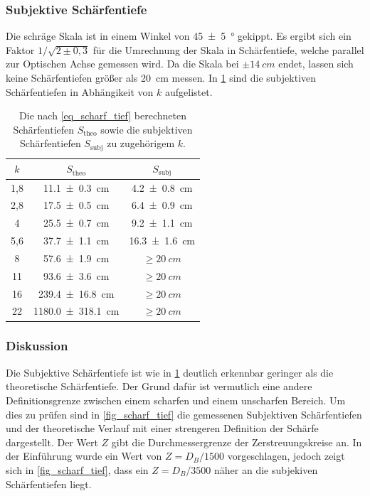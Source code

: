 \documentclass[
	a4paper,
	12pt,
	pagesize,
	ngerman
]{scrartcl}
\begin{document}
	\subsubsection*{Subjektive Schärfentiefe}
	Die schräge Skala ist in einem Winkel von \SI{45+-5}{\degree} gekippt.
	Es ergibt sich ein Faktor $1/\sqrt{2\pm 0,3}$ für die Umrechnung der Skala in Schärfentiefe, welche parallel zur Optischen Achse gemessen wird.
	Da die Skala bei $\pm\SI{14}{cm}$ endet, lassen sich keine Schärfentiefen größer als \SI{20}{cm} messen.
	In \cref{tab_scharf_tief} sind die subjektiven Schärfentiefen in Abhängikeit von $k$ aufgelistet.
	\begin{table}[H]
		\centering
		\begin{tabular}{ c | c | c}
			$k$ 	& $S_\text{theo}$ 		& $S_\text{subj}$ \\ \hline
			1,8 	& \SI{11,1 +- 0,3}{cm} 		& \SI{4,2 +- 0,8}{cm}\\
			2,8 	& \SI{17,5 +- 0,5}{cm}		& \SI{6,4 +- 0,9}{cm} \\
			4 	& \SI{25,5 +- 0,7}{cm}		& \SI{9,2 +- 1,1}{cm} \\
			5,6 	& \SI{37,7 +- 1,1}{cm}		& \SI{16,3 +- 1,6}{cm} \\
			8 	& \SI{57,6 +- 1,9}{cm}		& $\geq\SI{20}{cm}$ \\
			11 	& \SI{93,6 +- 3,6}{cm}		& $\geq\SI{20}{cm}$ \\
			16 	& \SI{239,4 +- 16,8}{cm}	& $\geq\SI{20}{cm}$ \\
			22 	& \SI{1180,0 +- 318,1}{cm}	& $\geq\SI{20}{cm}$ \\
		\end{tabular}
		\caption{Die nach \cref{eq_scharf_tief} berechneten Schärfentiefen $S_\text{theo}$ sowie die subjektiven Schärfentiefen $S_\text{subj}$ zu zugehörigem $k$. } %
		\label{tab_scharf_tief} 
	\end{table}


	
	\subsubsection{Diskussion}
	Die Subjektive Schärfentiefe ist wie in \cref{tab_scharf_tief} deutlich erkennbar  geringer als die theoretische Schärfentiefe.
	Der Grund dafür ist vermutlich eine andere Definitionsgrenze zwischen einem scharfen und einem unscharfen Bereich.
	Um dies zu prüfen sind in \cref{fig_scharf_tief} die gemessenen Subjektiven Schärfentiefen und der theoretische Verlauf mit einer strengeren Definition der Schärfe dargestellt.
	Der Wert $Z$ gibt die Durchmessergrenze der Zerstreuungskreise an. 
	In der Einführung wurde ein Wert von $Z=D_B/1500$ vorgeschlagen, jedoch zeigt sich in \cref{fig_scharf_tief}, dass ein $Z=D_B/3500$ näher an die subjekiven Schärfentiefen liegt.
\end{document}
